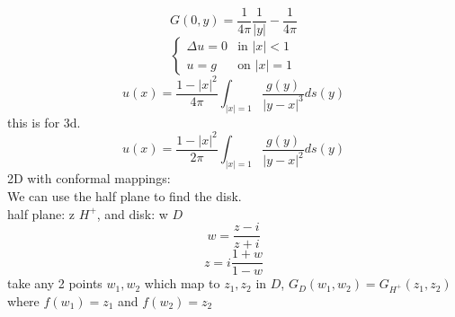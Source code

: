 \documentclass[answers,12pt,addpoints]{exam}
\begin{document}
$$G(0,y) = \frac{1}{4\pi} \frac{1}{|y|} - \frac{1}{4\pi} $$
$$ \begin{cases}
    \Delta u = 0 & \text{in } |x| < 1\\
    u = g & \text{on } |x| = 1
\end{cases}$$
$$u(x) = \frac{1-|x|^2}{4\pi} \int_{|x| = 1} \frac{g(y)}{|y-x|^3} ds(y)$$
this is for 3d.
$$u(x) = \frac{1-|x|^2}{2\pi} \int_{|x| = 1} \frac{g(y)}{|y-x|^2} ds(y)$$
2D with conformal mappings:\\
We can use the half plane to find the disk.\\
half plane: z $H^+$, and disk: w $D$\\
$$w = \frac{z-i}{z+i}$$
$$z = i\frac{1+w}{1-w}$$
take any 2 points $w_1, w_2$ which map to $z_1, z_2$ in $D$, $G_D(w_1, w_2) = G_{H^+}(z_1, z_2)$\\
where $f(w_1) = z_1$ and $f(w_2) = z_2$\\
\end{document}
